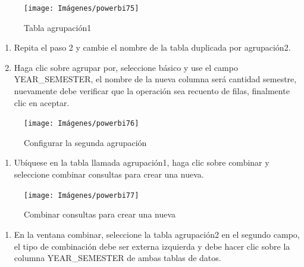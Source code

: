 \documentclass[
]{book}
\providecommand{\tightlist}{%
  \setlength{\itemsep}{0pt}\setlength{\parskip}{0pt}}
\begin{document}
\begin{figure}

{\centering \texttt{[image: Imágenes/powerbi75]} 

}

\caption{Tabla agrupación1}\label{fig:paso5porcentajes-fig}
\end{figure}

\begin{enumerate}
\def\labelenumi{\arabic{enumi}.}
\setcounter{enumi}{5}
\item
  Repita el paso 2 y cambie el nombre de la tabla duplicada por agrupación2.
\item
  Haga clic sobre agrupar por, seleccione básico y use el campo YEAR\_SEMESTER, el nombre de la nueva columna será cantidad semestre, nuevamente debe verificar que la operación sea recuento de filas, finalmente clic en aceptar.
\end{enumerate}

\begin{figure}

{\centering \texttt{[image: Imágenes/powerbi76]} 

}

\caption{Configurar la segunda agrupación}\label{fig:paso7porcentajes-fig}
\end{figure}

\begin{enumerate}
\def\labelenumi{\arabic{enumi}.}
\setcounter{enumi}{7}
\tightlist
\item
  Ubíquese en la tabla llamada agrupación1, haga clic sobre combinar y seleccione combinar consultas para crear una nueva.
\end{enumerate}

\begin{figure}

{\centering \texttt{[image: Imágenes/powerbi77]} 

}

\caption{Combinar consultas para crear una nueva}\label{fig:paso8porcentajes-fig}
\end{figure}

\begin{enumerate}
\def\labelenumi{\arabic{enumi}.}
\setcounter{enumi}{8}
\tightlist
\item
  En la ventana combinar, seleccione la tabla agrupación2 en el segundo campo, el tipo de combinación debe ser externa izquierda y debe hacer clic sobre la columna YEAR\_SEMESTER de ambas tablas de datos.
\end{enumerate}
\end{document}

